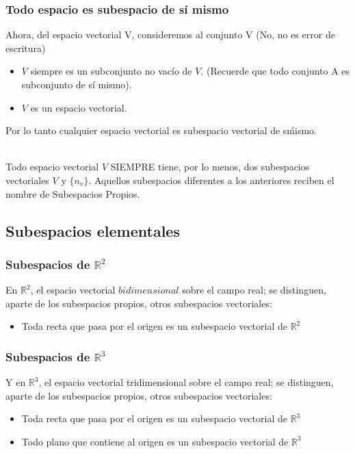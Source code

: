 \subsubsection{Todo espacio es subespacio de sí mismo}
Ahora, del espacio vectorial V, consideremos al conjunto V (No, no es error de escritura)
\begin{itemize}
\item $V$ siempre es un subconjunto no vac\'io de $V$. (Recuerde que todo conjunto A es subconjunto de s\'i mismo).
\item $V$ es un espacio vectorial.
\end{itemize}

Por lo tanto cualquier espacio vectorial es subespacio vectorial de s\' mismo.

~\\
Todo espacio vectorial $V$ SIEMPRE tiene, por lo menos, dos subespacios vectoriales $V$ y $\lbrace n_v\rbrace$. Aquellos subespacios diferentes a los anteriores reciben el nombre de Subespacios Propios.
~\\
\subsection{Subespacios elementales}
\subsubsection{Subespacios de $\mathbb{R}^2$}
En $\mathbb{R}^2$, el espacio vectorial $bidimensional$ sobre el campo real; se distinguen, aparte de los subespacios propios, otros subespacios vectoriales:


\begin{itemize}
\item Toda recta que pasa por el origen es un subespacio vectorial de $\mathbb{R}^2$

\end{itemize}
\subsubsection{Subespacios de $\mathbb{R}^3$}
Y en $\mathbb{R}^3$, el espacio vectorial tridimensional sobre el campo real; se distinguen, aparte de los subespacios propios, otros subespacios vectoriales:

\begin{itemize}
\item Toda recta que pasa por el origen es un subespacio vectorial de $\mathbb{R}^3$
\item Todo plano que contiene al origen es un subespacio vectorial de $\mathbb{R}^3$
\end{itemize}

